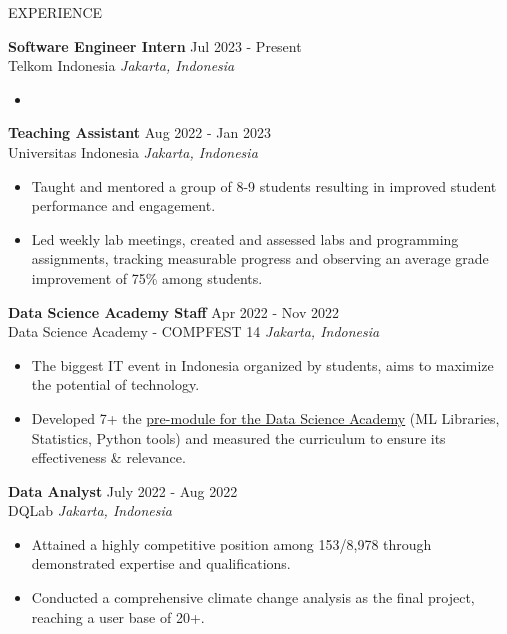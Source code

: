 \documentclass{resume} %
\begin{document}
\begin{rSection}{EXPERIENCE}

\textbf{Software Engineer Intern} \hfill Jul 2023 - Present \\
Telkom Indonesia \hfill \textit{Jakarta, Indonesia}
\vspace{-0.75em}
\begin{itemize}
\itemsep -7pt {}
\item 
 \end{itemize}
 \vspace{-0.5em}

\textbf{Teaching Assistant} \hfill Aug 2022 - Jan 2023 \\
Universitas Indonesia \hfill \textit{Jakarta, Indonesia}
\vspace{-0.75em}
\begin{itemize}
\itemsep -7pt {}
\item Taught and mentored a group of 8-9 students resulting in improved student performance and engagement.
\item Led weekly lab meetings, created and assessed labs and programming assignments, tracking measurable progress and observing an average grade improvement of 75\% among students.
 \end{itemize}
 \vspace{-0.5em}

\textbf{Data Science Academy Staff} \hfill Apr 2022 - Nov 2022 \\
Data Science Academy - COMPFEST 14 \hfill \textit{Jakarta, Indonesia}
\vspace{-0.75em}
\begin{itemize}
\itemsep -7pt {}
\item The biggest IT event in Indonesia organized by students, aims to maximize the potential of technology.
\item Developed 7+ the \href{https://south-tomato-2e2.notion.site/Pre-Module-Data-Science-Academy-ee098d9d28b7496eb45d3cd2555e1168?pvs=4}{pre-module for the Data Science Academy} (ML Libraries, Statistics, Python tools) and measured the curriculum to ensure its effectiveness \& relevance.
 \end{itemize}
 \vspace{-0.5em}

\textbf{Data Analyst} \hfill July 2022 - Aug 2022 \\
DQLab \hfill \textit{Jakarta, Indonesia}
\vspace{-0.75em}
\begin{itemize}
\itemsep -7pt {}
\item Attained a highly competitive position among 153/8,978 through demonstrated expertise and qualifications.
\item Conducted a comprehensive climate change analysis as the final project, reaching a user base of 20+.
 \end{itemize}
 \vspace{-0.5em}


\end{rSection} 
\end{document}
